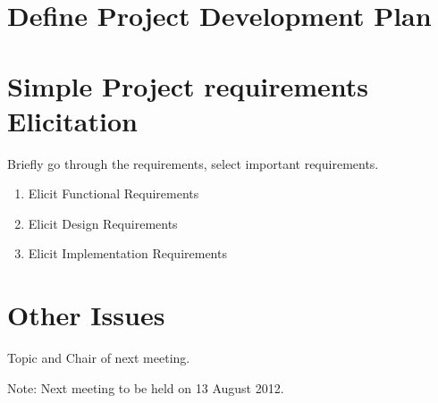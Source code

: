 \documentclass[11pt, a4paper]{article}
\begin{document}
\section{Define Project Development Plan}
\section{Simple Project requirements Elicitation}
Briefly go through the requirements, select important requirements. 
\begin{enumerate}

\item Elicit Functional Requirements

\item Elicit Design Requirements

\item Elicit Implementation Requirements

\end{enumerate}



\section{Other Issues}
Topic and Chair of next meeting.

\vspace*{10pt}
\noindent Note: Next meeting to be held on 13 August 2012.
\end{document}
